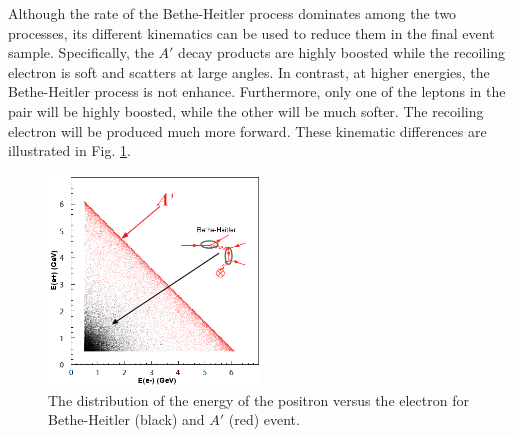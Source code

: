 Although the rate of the Bethe-Heitler process dominates among the two 
processes, its different kinematics can be used to reduce them in the final 
event sample.  Specifically, the $A'$ decay products are highly boosted while 
the recoiling electron is soft and scatters at large angles.  In contrast, 
at higher energies, the Bethe-Heitler process is not enhance.  Furthermore,
only one of the leptons in the pair will be highly boosted, while the other
will be much softer.  The recoiling electron will be produced much more forward.
These kinematic differences are illustrated in Fig. \ref{fig:ap_v_bethe}.
\begin{figure}[t]
    \centering
    \includegraphics[width=0.5\textwidth]{images/bh_energy_cut.png}
    \caption{The distribution of the energy of the positron versus the electron
    for Bethe-Heitler (black) and $A'$ (red) event.}
    \label{fig:ap_v_bethe}
\end{figure}


